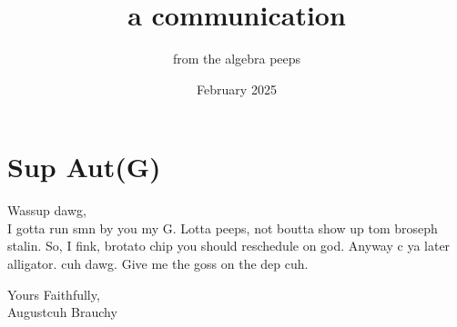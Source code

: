 \documentclass{article}\usepackage{graphicx}
\title{a communication}
\author{from the algebra peeps}
\date{February 2025}
\begin{document}
\maketitle

\section*{Sup Aut(G)}
Wassup dawg, \\
I gotta run smn by you my G. Lotta peeps, not boutta show up tom broseph stalin. So, I fink, brotato chip you should reschedule on god. Anyway c ya later alligator. cuh dawg. Give me the goss on the dep cuh. 

\bigskip
\noindent Yours Faithfully, \\
Augustcuh Brauchy
\end{document}
